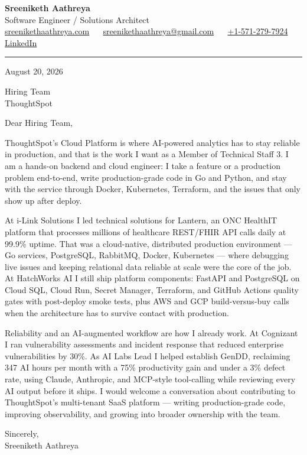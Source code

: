 \documentclass[11pt, letterpaper]{article}
\begin{document}
{\fontsize{18 pt}{20 pt}\selectfont\bfseries Sreeniketh Aathreya}\\[4pt]
Software Engineer / Solutions Architect\\[6pt]
\href{https://sreenikethaathreya.com}{sreenikethaathreya.com}
~\textbullet~
\href{mailto:sreenikethaathreya@gmail.com}{sreenikethaathreya@gmail.com}
~\textbullet~
\href{tel:+1-571-279-7924}{+1-571-279-7924}
~\textbullet~
\href{https://www.linkedin.com/in/sreeniketh-aathreya-16800b122/}{LinkedIn}

\vspace{12pt}
\hrule
\vspace{12pt}

August 20, 2026

\vspace{8pt}

Hiring Team\\
ThoughtSpot

\vspace{12pt}

Dear Hiring Team,

ThoughtSpot's Cloud Platform is where AI-powered analytics has to stay reliable in production, and that is the work I want as a Member of Technical Staff 3. I am a hands-on backend and cloud engineer: I take a feature or a production problem end-to-end, write production-grade code in Go and Python, and stay with the service through Docker, Kubernetes, Terraform, and the issues that only show up after deploy.

At i-Link Solutions I led technical solutions for Lantern, an ONC HealthIT platform that processes millions of healthcare REST/FHIR API calls daily at 99.9\% uptime. That was a cloud-native, distributed production environment --- Go services, PostgreSQL, RabbitMQ, Docker, Kubernetes --- where debugging live issues and keeping relational data reliable at scale were the core of the job. At HatchWorks AI I still ship platform components: FastAPI and PostgreSQL on Cloud SQL, Cloud Run, Secret Manager, Terraform, and GitHub Actions quality gates with post-deploy smoke tests, plus AWS and GCP build-versus-buy calls when the architecture has to survive contact with production.

Reliability and an AI-augmented workflow are how I already work. At Cognizant I ran vulnerability assessments and incident response that reduced enterprise vulnerabilities by 30\%. As AI Labs Lead I helped establish GenDD, reclaiming 347 AI hours per month with a 75\% productivity gain and under a 3\% defect rate, using Claude, Anthropic, and MCP-style tool-calling while reviewing every AI output before it ships. I would welcome a conversation about contributing to ThoughtSpot's multi-tenant SaaS platform --- writing production-grade code, improving observability, and growing into broader ownership with the team.

Sincerely,\\[12pt]
Sreeniketh Aathreya
\end{document}
